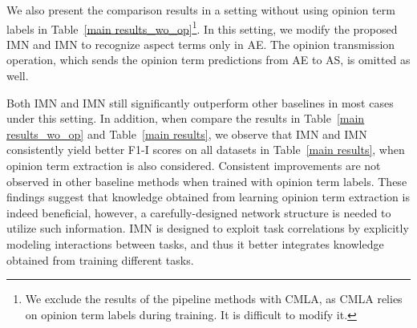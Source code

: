 \documentclass[11pt,a4paper]{article}
\begin{document}
We also present the comparison results in a setting without using opinion term labels in Table~\ref{main results_wo_op}\footnote{We exclude the results of the pipeline methods with CMLA, as CMLA relies on opinion term labels during training. It is difficult to modify it.}. In this setting, we modify the proposed IMN and IMN to recognize aspect terms only in AE. The opinion transmission operation, which sends the opinion term predictions from AE to AS, is omitted as well. 

Both IMN and IMN still significantly outperform other baselines in most cases under this setting. In addition, when compare the results in Table~\ref{main results_wo_op} and Table~\ref{main results}, we observe that IMN and IMN consistently yield better F1-I scores on all datasets in Table~\ref{main results}, when opinion term extraction is also considered. Consistent improvements are not observed in other baseline methods when trained with opinion term labels. These findings suggest that knowledge obtained from learning opinion term extraction is indeed beneficial, however, a carefully-designed network structure is needed to utilize such information. IMN is designed to exploit task correlations by explicitly modeling interactions between tasks, and thus it better integrates knowledge obtained from training different tasks. 
\end{document}
